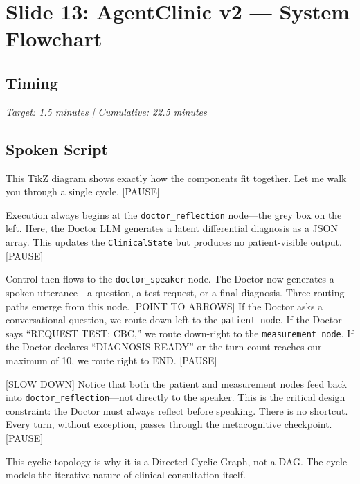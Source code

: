 

\section{Slide 13: AgentClinic v2 --- System Flowchart}

\subsection*{Timing}
\textit{Target: 1.5 minutes | Cumulative: 22.5 minutes}

\subsection*{Spoken Script}
\begin{spokenbox}
 This TikZ diagram shows exactly how the components fit together. Let me walk you through a single cycle. [PAUSE]

Execution always begins at the \texttt{doctor\_reflection} node---the grey box on the left. Here, the Doctor LLM generates a latent differential diagnosis as a JSON array. This updates the \texttt{ClinicalState} but produces no patient-visible output. [PAUSE]

Control then flows to the \texttt{doctor\_speaker} node. The Doctor now generates a spoken utterance---a question, a test request, or a final diagnosis. Three routing paths emerge from this node. [POINT TO ARROWS] If the Doctor asks a conversational question, we route down-left to the \texttt{patient\_node}. If the Doctor says ``REQUEST TEST: CBC,'' we route down-right to the \texttt{measurement\_node}. If the Doctor declares ``DIAGNOSIS READY'' or the turn count reaches our maximum of 10, we route right to END. [PAUSE]

[SLOW DOWN] Notice that both the patient and measurement nodes feed back into \texttt{doctor\_reflection}---not directly to the speaker. This is the critical design constraint: the Doctor must always reflect before speaking. There is no shortcut. Every turn, without exception, passes through the metacognitive checkpoint. [PAUSE]

This cyclic topology is why it is a Directed Cyclic Graph, not a DAG. The cycle models the iterative nature of clinical consultation itself.
\end{spokenbox}

